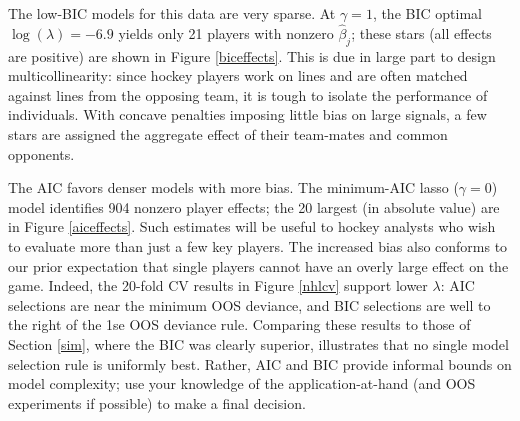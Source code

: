 \documentclass[12pt]{article}
\begin{document}
The low-BIC models for this data are very sparse.  At $\gamma=1$,
the BIC optimal
$\log(\lambda)=-6.9$
yields only 21 players with nonzero $\hat\beta_j$; these stars (all effects are positive) are shown in Figure
\ref{biceffects}.  This is due in large part to design multicollinearity:
since hockey players work on lines and are often matched against lines from
the opposing team, it is tough to isolate the performance of individuals.
With concave penalties imposing little bias on large signals, a few stars are assigned the
aggregate effect of their team-mates and common opponents.

The AIC  favors denser models with more bias.  The minimum-AIC lasso
($\gamma=0$) model identifies 904 nonzero player effects; the 20 largest (in
absolute value) are in Figure \ref{aiceffects}. Such estimates will be useful
to hockey analysts who wish to evaluate more than just a few key players.  The
increased bias also conforms to our prior expectation that single players
cannot have an overly large effect on the game. Indeed, the 20-fold CV results
in Figure \ref{nhlcv} support lower $\lambda$:  AIC selections are near the
minimum OOS deviance, and BIC selections are well to the right of the 1se OOS
deviance rule.  Comparing these results to those of Section \ref{sim}, where
the BIC was clearly superior, illustrates that no single model selection rule
is uniformly best.  Rather, AIC and BIC   provide informal bounds on model
complexity; use your knowledge of the application-at-hand (and OOS experiments
if possible) to make a final decision.
\end{document}
